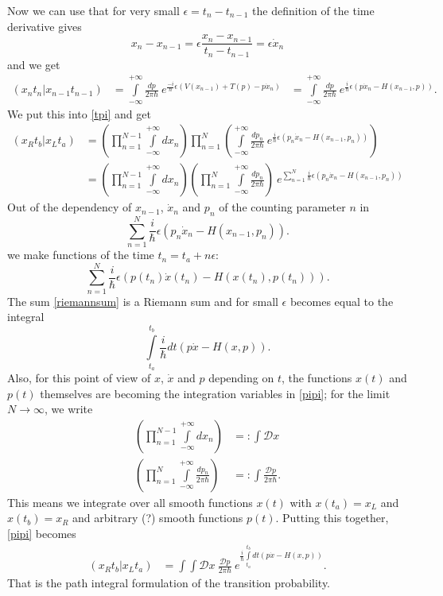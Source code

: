 Now we can use that for very small $\epsilon = t_n - t_{n-1}$ the definition of the time derivative gives
\begin{equation}\label{deriv}
  x_{n} - x_{n-1} = \epsilon \frac{x_{n} -x_{n-1}}{t_n - t_{n-1}} =  \epsilon \dot{x}_n
\end{equation}
and we get
\begin{align}
   (x_n t_n | x_{n-1} t_{n-1})  &=  \int\limits_{-\infty}^{+\infty} \frac{dp}{2 \pi \hbar}  \ e^{\frac{-i}{\hbar} \epsilon ( V(x_{n-1}) + T(p) - p \dot{x}_n)}
                                &=  \int\limits_{-\infty}^{+\infty} \frac{dp}{2 \pi \hbar}  \ e^{\frac{i}{\hbar} \epsilon (p \dot{x}_n - H(x_{n-1},p))}.
\end{align}
We put this into \ref{tpi} and get 
\begin{align}
  (x_R t_b | x_L t_a) &=  (\prod_{n=1}^{N-1} \int\limits_{-\infty}^{+\infty} dx_{n})\prod_{n=1}^{N} (\int\limits_{-\infty}^{+\infty} \frac{dp_n}{2 \pi \hbar}  \ e^{\frac{i}{\hbar} \epsilon (p_n \dot{x}_n - H(x_{n-1},p_n))})  \\
                      &=  (\prod_{n=1}^{N-1} \int\limits_{-\infty}^{+\infty} dx_{n})(\prod_{n=1}^{N} \int\limits_{-\infty}^{+\infty}  \frac{dp_n}{2 \pi \hbar}) \ e^{\sum_{n=1}^{N}\frac{i}{\hbar} \epsilon (p_n \dot{x}_n - H(x_{n-1},p_n))} \label{pipi}
\end{align}
Out of the dependency of $x_{n-1}$, $\dot{x}_n$ and $p_n$ of the counting parameter $n$ in
\begin{equation}
  \sum_{n=1}^{N}\frac{i}{\hbar} \epsilon (p_n \dot{x}_n - H(x_{n-1},p_n)).
\end{equation}
we make  functions of the time $t_n = t_a + n \epsilon$:
\begin{equation}\label{riemannsum}
  \sum_{n=1}^{N}\frac{i}{\hbar} \epsilon (p(t_n) \dot{x}(t_n) - H(x(t_n),p(t_n))).
\end{equation}
The sum \ref{riemannsum} is a Riemann sum and for small $\epsilon$ becomes equal to the integral
\begin{equation}
  \int\limits_{t_a}^{t_b}  \frac{i}{\hbar} dt (p \dot{x} - H(x,p)).
\end{equation}
Also, for this point of view of  $x$, $\dot{x}$ and $p$ depending on $t$, the functions $x(t)$ and $p(t)$ themselves are becoming the integration variables in \ref{pipi}; for the limit $N \rightarrow \infty$, we write
\begin{align}
     (\prod_{n=1}^{N-1} \int\limits_{-\infty}^{+\infty} dx_{n}) &=: \int \mathcal{D} x   \\
     (\prod_{n=1}^{N} \int\limits_{-\infty}^{+\infty}  \frac{dp_n}{2 \pi \hbar}) &=: \int \frac{ \mathcal{D}p}{2 \pi \hbar}.
\end{align}
This means we integrate over all smooth functions $x(t)$ with $x(t_a) = x_L$ and $x(t_b) = x_R$ and arbitrary (?) smooth functions $p(t)$.
Putting this together, \ref{pipi} becomes
\begin{align}
  (x_R t_b | x_L t_a) &=  \int \int  \mathcal{D} x \ \frac{ \mathcal{D}p}{2 \pi \hbar} \ e^{  \frac{i}{\hbar}   \int\limits_{t_a}^{t_b}dt (p \dot{x} - H(x,p))} .
\end{align}
That is the path integral formulation of the transition probability.

